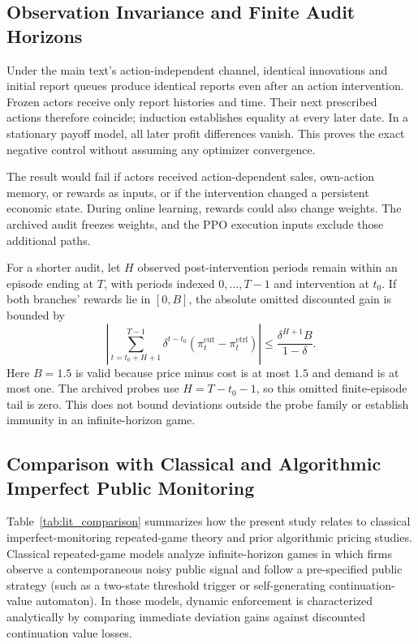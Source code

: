 \documentclass{article}
\begin{document}
\subsection{Observation Invariance and Finite Audit Horizons}

Under the main text's action-independent channel, identical innovations and initial report queues produce identical reports even after an action intervention. Frozen actors receive only report histories and time. Their next prescribed actions therefore coincide; induction establishes equality at every later date. In a stationary payoff model, all later profit differences vanish. This proves the exact negative control without assuming any optimizer convergence.

The result would fail if actors received action-dependent sales, own-action memory, or rewards as inputs, or if the intervention changed a persistent economic state. During online learning, rewards could also change weights. The archived audit freezes weights, and the PPO execution inputs exclude those additional paths.

For a shorter audit, let $H$ observed post-intervention periods remain within an episode ending at $T$, with periods indexed $0,\ldots,T-1$ and intervention at $t_0$. If both branches' rewards lie in $[0, B]$, the absolute omitted discounted gain is bounded by
\[
\left| \sum_{t=t_0+H+1}^{T-1} \delta^{t-t_0} (\pi_t^{\mathrm{cut}} - \pi_t^{\mathrm{ctrl}}) \right| \leq \frac{\delta^{H+1} B}{1-\delta}.
\]
Here $B = 1.5$ is valid because price minus cost is at most $1.5$ and demand is at most one. The archived probes use $H = T - t_0 - 1$, so this omitted finite-episode tail is zero. This does not bound deviations outside the probe family or establish immunity in an infinite-horizon game.

\subsection{Comparison with Classical and Algorithmic Imperfect Public Monitoring}

Table~\ref{tab:lit_comparison} summarizes how the present study relates to classical imperfect-monitoring repeated-game theory and prior algorithmic pricing studies. Classical repeated-game models \citep{green1984noncooperative, abreu1990toward, fudenberg1994folk} analyze infinite-horizon games in which firms observe a contemporaneous noisy public signal and follow a pre-specified public strategy (such as a two-state threshold trigger or self-generating continuation-value automaton). In those models, dynamic enforcement is characterized analytically by comparing immediate deviation gains against discounted continuation value losses.
\end{document}

